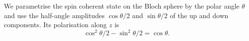 \documentclass{article}
\begin{document}
We parametrise the spin coherent state on the Bloch sphere by the polar angle $\theta$ and use
the half-angle amplitudes $\cos\theta/2$ and $\sin\theta/2$ of the up and down components.
Its polarisation along $z$ is
\begin{equation}
\cos^2\theta/2 - \sin^2\theta/2 = \cos\theta .
\label{eq:pz}
\end{equation}
\end{document}
